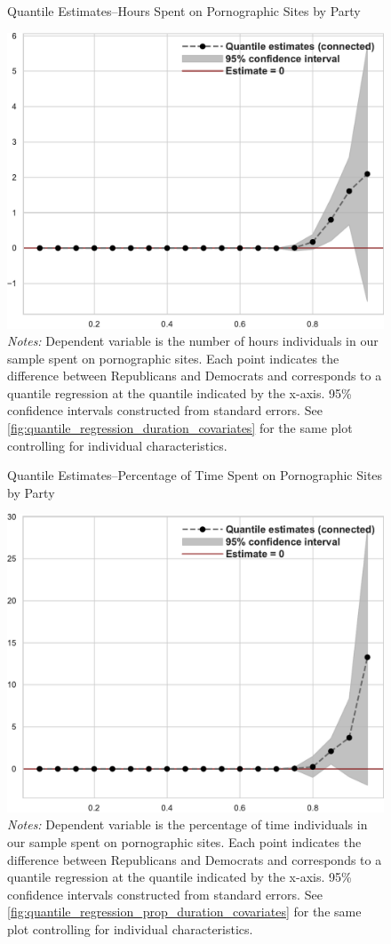 \documentclass[12pt, letterpaper]{article}
\begin{document}
\begin{figure}[t]
	\centering
	\caption{Quantile Estimates--Hours Spent on Pornographic Sites by Party}
	\includegraphics[width=.7\linewidth]{../figs/quantile_reg_duration_adult.pdf}
	\caption*{\footnotesize \emph{Notes:} 
		Dependent variable is the number of hours individuals in our sample spent on pornographic sites.
		Each point indicates the difference between Republicans and Democrats and corresponds to a quantile regression at the quantile indicated by the x-axis.
		95\% confidence intervals constructed from standard errors.
		See \cref{fig:quantile_regression_duration_covariates} for the same plot controlling for individual characteristics.
	}
	\label{fig:quantile_regression_duration}
\end{figure}

\begin{figure}[t]
	\centering
	\caption{Quantile Estimates--Percentage of Time Spent on Pornographic Sites by Party}
	\includegraphics[width=.7\linewidth]{../figs/quantile_reg_proportion_duration_adult.pdf}
	\caption*{\footnotesize \emph{Notes:} 
		Dependent variable is the percentage of time individuals in our sample spent on pornographic sites.
		Each point indicates the difference between Republicans and Democrats and corresponds to a quantile regression at the quantile indicated by the x-axis.
		95\% confidence intervals constructed from standard errors.
		See \cref{fig:quantile_regression_prop_duration_covariates} for the same plot controlling for individual characteristics.
	}
	\label{fig:quantile_regression_prop_duration}
\end{figure}
\end{document}
